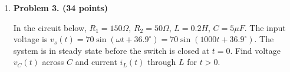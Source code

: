 \begin{enumerate}
  \begin{comment}
  {\bf Solution:} $\tau=L/(R_2+R_3)=10^{-2}/40=2.5\times 10^{-4}\,s$
  \[
  i_L(0^-)=i_L(0^+)=I_0\frac{R_1}{R_1+R_3}=5A\frac{20}{50}=2A,\;\;\;\;\;
  i_L(\infty)=0,\;\;\;\;\;i_L(t)=2\,e^{-t/\tau}
  \]
  \[ 
  v_1(t)=5\times 20=100\,V,\;\;\;\; v_2(t)=R_2 i_L(t)=-20\,e^{-t/\tau},\;\;\;\;\;
  v_3(t)=R_3 i_L(t)=60\,e^{-t/\tau},\;\;\;\;\;
  v_L(t)=-80\,e^{-t/\tau}
  \]
  \end{comment}

\item {\bf Problem 3. (34 points)} 

  In the circuit below, $R_1=150\Omega$, $R_2=50\Omega$, $L=0.2H$, $C=5\mu F$.
  The input voltage is $v_s(t)=70\sin(\omega t+36.9^\circ)=70\sin(1000 t+36.9^\circ)$.
  The system is in steady state before the switch is closed at $t=0$. Find voltage 
  $v_C(t)$ across $C$ and current $i_L(t)$ through $L$ for $t>0$.


  \begin{comment}
  {\bf Solution:} 
  The phasor form of the input voltage is:
  \[ \dot{V}_s=70/\sqrt{2}\angle 36.9^\circ =49.49\angle 36.9^\circ \]
  Find $i_L(t)$:
  \[ \dot{I}_L=\frac{\dot{V_s}}{R_1+R_2+j(\omega L-1/\omega C)}
  =\frac{49.49\angle 36.9^\circ}{150+50+j(200-200)}=0.247\angle 36.9^\circ \]
  \[ i_L(t)=0.35\;\sin(\omega t+36.9^\circ)\;\;\;\;\;(t<0) \]
  \[ i_L(0_-)=0.35\;\sin(36.9^\circ)=0.21\;A \]
  \[ \dot{V}_C=Z_C \dot{I}=\dot{I}/j\omega C =49.49\angle -53.1^\circ \]
  \[ v_C(0_-)=70\;sin(-53.1^\circ)=-55.98\;V \]

  For $t>0$, the switch is closed, $\tau_C=R_2C=2.5\times 10^{-4}$, 
  $1/\tau_1=4000$, $\tau_L=L/R_1=1.33\times 10^{-3}$, $1/\tau_L=750$.
  As the steady state of $v_C(t)$ is zero, we can find $v_C(t)$ to be
  \[ v_C(t)=-55.98\;e^{-4000  t} \]
  Find steady state of $i_L(t)$:
  \[ \dot{I}_L=\frac{\dot{V}_s}{R_1+j\omega L}=\frac{49.49\angle 36.9}{150+j200}
  =0.2\angle -16.23 \]
  the steady state of $i_L(t)$ is
  \[ i_L(t)=0.2\sqrt{2}\sin(\omega t-16.23^\circ)=0.283\sin(\omega t-16.23^\circ) \]
  Evaluating $i_L(t)$ at $t=0$ we get:
  \[ i_L(0)=0.283\sin(-16.23^\circ)=-0.08 \]
  The complete $i_L(t)$ is
  \[ i_L(t)=0.283\sin(\omega t-16.23^\circ)+[0.21-(-0.08)]e^{-t/\tau_L}
  =0.283\sin(\omega t-16.23^\circ)+0.29\;e^{-750\;t} \]

  \end{comment}



\end{enumerate}


